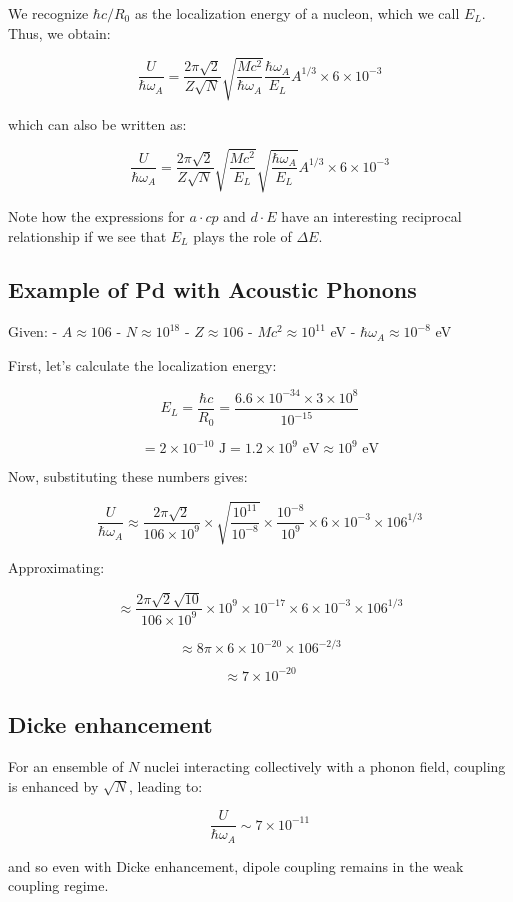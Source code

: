 \documentclass[
]{article}
\renewcommand{\[}{\begin{equation}}
\renewcommand{\]}{\end{equation}}
\begin{document}
We recognize \(\hbar c / R_0\) as the localization energy of a nucleon,
which we call \(E_L\). Thus, we obtain:

\[
\frac{U}{\hbar \omega_A} = \frac{2\pi\sqrt{2}}{Z \sqrt{N}} \sqrt{\frac{M c^2}{\hbar \omega_A}} \frac{\hbar \omega_A}{E_L} A^{1/3} \times 6 \times 10^{-3}
\]

which can also be written as:

\[
\frac{U}{\hbar \omega_A} = \frac{2\pi\sqrt{2}}{Z \sqrt{N}} \sqrt{\frac{M c^2}{E_L}} \sqrt{\frac{\hbar \omega_A}{E_L}} A^{1/3} \times 6 \times 10^{-3}
\]

Note how the expressions for \(a \cdot cp\) and \(d \cdot E\) have an
interesting reciprocal relationship if we see that \(E_L\) plays the
role of \(\Delta E\).

\subsection{Example of Pd with Acoustic
Phonons}\label{example-of-pd-with-acoustic-phonons}

Given: - \(A \approx 106\) - \(N \approx 10^{18}\) - \(Z \approx 106\) -
\(M c^2 \approx 10^{11}\) eV - \(\hbar \omega_A \approx 10^{-8}\) eV

First, let's calculate the localization energy:

\[
E_L = \frac{\hbar c}{R_0} = \frac{6.6 \times 10^{-34} \times 3 \times 10^8}{10^{-15}}
\]

\[
= 2 \times 10^{-10} \text{ J} = 1.2 \times 10^9 \text{ eV} \approx 10^9 \text{ eV}
\]

Now, substituting these numbers gives:

\[
\frac{U}{\hbar \omega_A} \approx \frac{2 \pi\sqrt{2} }{106 \times 10^9} \times \sqrt{\frac{10^{11}}{10^{-8}}} \times \frac{10^{-8}}{10^9} \times 6 \times 10^{-3} \times 106^{1/3}
\]

Approximating:

\[
\approx \frac{ 2 \pi \sqrt{2} \sqrt{10}}{106 \times 10^9} \times 10^9 \times 10^{-17} \times 6 \times 10^{-3} \times 106^{1/3}
\]

\[
\approx 8\pi \times 6 \times 10^{-20} \times 106^{-2/3}
\]

\[
\approx 7 \times 10^{-20}
\]

\subsection{Dicke enhancement}\label{dicke-enhancement-1}

For an ensemble of \(N\) nuclei interacting collectively with a phonon
field, coupling is enhanced by \(\sqrt{N}\), leading to:

\[
\frac{U}{\hbar \omega_A} \sim 7 \times 10^{-11}
\]

and so even with Dicke enhancement, dipole coupling remains in the weak
coupling regime.

\printbibliography
\end{document}
